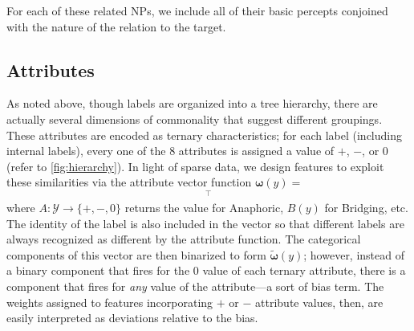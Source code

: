 \documentclass[11pt,letterpaper]{article}
\newcommand{\ensuretext}[1]{#1}
\newcommand{\nssmarker}{\ensuretext{\textcolor{magenta}{\ensuremath{^{\textsc{NS}}_{\textsc{S}}}}}}
\newcommand{\arkcomment}[3]{\ensuretext{\textcolor{#3}{[#1 #2]}}}
\newcommand{\nss}[1]{\arkcomment{\nssmarker}{#1}{magenta}}
\newcommand{\costversion}[1]{}
\begin{document}
For each of these related NPs, we include all of their basic percepts 
conjoined with the nature of the relation to the target.

\subsection{Attributes}\label{sec:attrs}

As noted above, though labels are organized into a tree hierarchy, 
there are actually several dimensions of commonality that suggest different groupings.
These attributes are encoded as ternary characteristics; 
for each label (including internal labels), every one of the 8 attributes  
is assigned a value of $+$, $-$, or $0$ (refer to \cref{fig:hierarchy}).
In light of sparse data, we design features\costversion{ and cost function} to exploit these similarities 
via the attribute vector function $\boldsymbol{\omega}(y) = $
\begin{equation*}
[y, A(y), B(y), G(y), O(y), P(y), R(y), S(y), U(y)]^{\top}
\end{equation*}
where $A: \costversion{\mathcal{L} \cup \mathcal{I}\nss{}}\mathcal{Y} \rightarrow \{+, -, 0\}$ returns the value for Anaphoric, 
$B(y)$ for Bridging, etc. The identity of the label is also included in the vector so that 
different labels are always recognized as different by the attribute function.
The categorical components of this vector are then binarized to form $\tilde{\boldsymbol{\omega}}(y)$; 
however, instead of a binary component that fires for the $0$ value of each ternary attribute, 
there is a component that fires for \emph{any} value of the attribute---a sort of bias term.
The weights assigned to features incorporating $+$ or $-$ attribute values, then, 
are easily interpreted as deviations relative to the bias.
\end{document}
